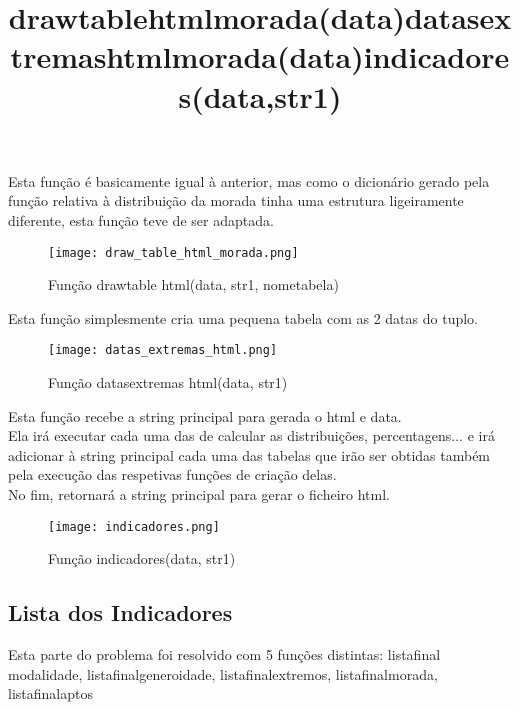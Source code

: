 \documentclass[11pt,a4paper]{report}%
\begin{document}
\newpage
\title{\textbf{draw\textunderscore table\textunderscore html\textunderscore morada(data)}}

Esta função é basicamente igual à anterior, mas como o dicionário gerado pela função relativa à distribuição da morada tinha uma estrutura ligeiramente diferente, esta função teve de ser adaptada.


\begin{figure}[htbp]
\centerline{\texttt{[image: draw\_table\_html\_morada.png]}}
\caption{Função draw\textunderscore table \textunderscore html(data, str1, nome\textunderscore tabela)}
\label{fig}
\end{figure}  


\title{\textbf{datas\textunderscore extremas\textunderscore html\textunderscore morada(data)}}

Esta função simplesmente cria uma pequena tabela com as 2 datas do tuplo.


\begin{figure}[htbp]
\centerline{\texttt{[image: datas\_extremas\_html.png]}}
\caption{Função datas\textunderscore extremas \textunderscore html(data, str1)}
\label{fig}
\end{figure}


\newpage
\title{\textbf{indicadores(data,str1)}}

Esta função recebe a string principal para gerada o html e data.\\
Ela irá executar cada uma das de calcular as distribuições, percentagens... e irá adicionar à string principal cada uma das tabelas que irão ser obtidas também pela execução das respetivas funções de criação delas.\\
No fim, retornará a string principal para gerar o ficheiro html.


\begin{figure}[htbp]
\centerline{\texttt{[image: indicadores.png]}}
\caption{Função indicadores(data, str1)}
\label{fig}
\end{figure} 



\newpage

\subsection{Lista dos Indicadores} \label{subsec:indicadoresList}

Esta parte do problema foi resolvido com 5 funções distintas: lista\textunderscore final \textunderscore modalidade, lista\textunderscore final\textunderscore genero\textunderscore idade, lista\textunderscore final\textunderscore extremos, lista\textunderscore final\textunderscore morada, lista\textunderscore final\textunderscore aptos\\
\end{document}
